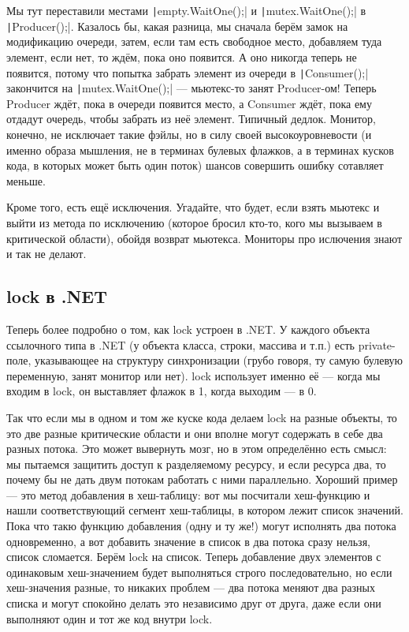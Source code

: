 \documentclass[a5paper]{article}
\begin{document}
Мы тут переставили местами \texttt|empty.WaitOne();| и \texttt|mutex.WaitOne();| в \texttt|Producer();|. Казалось бы, какая разница, мы сначала берём замок на модификацию очереди, затем, если там есть свободное место, добавляем туда элемент, если нет, то ждём, пока оно появится. А оно никогда теперь не появится, потому что попытка забрать элемент из очереди в \texttt|Consumer();| закончится на \texttt|mutex.WaitOne();| --- мьютекс-то занят Producer-ом! Теперь Producer ждёт, пока в очереди появится место, а Consumer ждёт, пока ему отдадут очередь, чтобы забрать из неё элемент. Типичный дедлок. Монитор, конечно, не исключает такие фэйлы, но в силу своей высокоуровневости (и именно образа мышления, не в терминах булевых флажков, а в терминах кусков кода, в которых может быть один поток) шансов совершить ошибку сотавляет меньше. 

Кроме того, есть ещё исключения. Угадайте, что будет, если взять мьютекс и выйти из метода по исключению (которое бросил кто-то, кого мы вызываем в критической области), обойдя возврат мьютекса. Мониторы про ислючения знают и так не делают.

\subsection{lock в .NET}

Теперь более подробно о том, как lock устроен в .NET. У каждого объекта ссылочного типа в .NET (у объекта класса, строки, массива и т.п.) есть private-поле, указывающее на структуру синхронизации (грубо говоря, ту самую булевую переменную, занят монитор или нет). lock использует именно её --- когда мы входим в lock, он выставляет флажок в 1, когда выходим --- в 0. 

Так что если мы в одном и том же куске кода делаем lock на разные объекты, то это две разные критические области и они вполне могут содержать в себе два разных потока. Это может вывернуть мозг, но в этом определённо есть смысл: мы пытаемся защитить доступ к разделяемому ресурсу, и если ресурса два, то почему бы не дать двум потокам работать с ними параллельно. Хороший пример --- это метод добавления в хеш-таблицу: вот мы посчитали хеш-функцию и нашли соответствующий сегмент хеш-таблицы, в котором лежит список значений. Пока что такю функцию добавления (одну и ту же!) могут исполнять два потока одновременно, а вот добавить значение в список в два потока сразу нельзя, список сломается. Берём lock на список. Теперь добавление двух элементов с одинаковым хеш-значением будет выполняться строго последовательно, но если хеш-значения разные, то никаких проблем --- два потока меняют два разных списка и могут спокойно делать это независимо друг от друга, даже если они выполняют один и тот же код внутри lock. 
\end{document}
